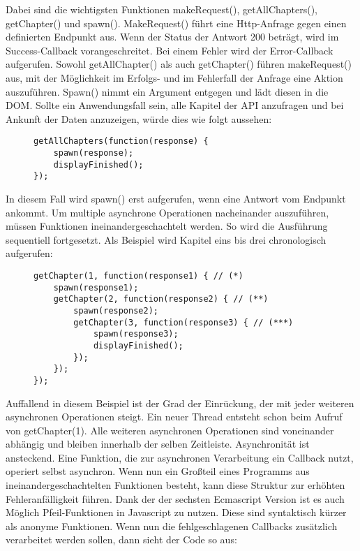 \noindent
Dabei sind die wichtigsten Funktionen makeRequest(), getAllChapters(), getChapter() und spawn(). MakeRequest() führt eine Http-Anfrage gegen einen definierten Endpunkt aus. Wenn der Status der Antwort 200 beträgt, wird im Success-Callback vorangeschreitet. Bei einem Fehler wird der Error-Callback aufgerufen. Sowohl getAllChapter() als auch getChapter() führen makeRequest() aus, mit der Möglichkeit im Erfolgs- und im Fehlerfall der Anfrage eine Aktion auszuführen. Spawn() nimmt ein Argument entgegen und lädt diesen in die DOM. Sollte ein Anwendungsfall sein, alle Kapitel der API anzufragen und bei Ankunft der Daten anzuzeigen, würde dies wie folgt aussehen:

\begin{figure}[H]
\begin{lstlisting}[basicstyle=\small]
getAllChapters(function(response) {
    spawn(response);
    displayFinished();
});
\end{lstlisting}
\end{figure}

\noindent
In diesem Fall wird spawn() erst aufgerufen, wenn eine Antwort vom Endpunkt ankommt. Um multiple asynchrone Operationen nacheinander auszuführen, müssen Funktionen ineinandergeschachtelt werden. So wird die Ausführung sequentiell fortgesetzt. Als Beispiel wird Kapitel eins bis drei chronologisch aufgerufen:

\begin{figure}[H]
\begin{lstlisting}[basicstyle=\small]
getChapter(1, function(response1) { // (*)
    spawn(response1);
    getChapter(2, function(response2) { // (**)
        spawn(response2);
        getChapter(3, function(response3) { // (***)
            spawn(response3);
            displayFinished();
        });
    });
});
\end{lstlisting}
\end{figure}

\noindent
Auffallend in diesem Beispiel ist der Grad der Einrückung, der mit jeder weiteren asynchronen Operationen steigt. Ein neuer Thread entsteht schon beim Aufruf von getChapter(1). Alle weiteren asynchronen Operationen sind voneinander abhängig und bleiben innerhalb der selben Zeitleiste. Asynchronität ist ansteckend. Eine Funktion, die zur asynchronen Verarbeitung ein Callback nutzt, operiert selbst asynchron. Wenn nun ein Großteil eines Programms aus ineinandergeschachtelten Funktionen besteht, kann diese Struktur zur erhöhten Fehleranfälligkeit führen. Dank der der sechsten Ecmascript Version ist es auch Möglich Pfeil-Funktionen in Javascript zu nutzen. Diese sind syntaktisch kürzer als anonyme Funktionen. Wenn nun die fehlgeschlagenen Callbacks zusätzlich verarbeitet werden sollen, dann sieht der Code so aus:


